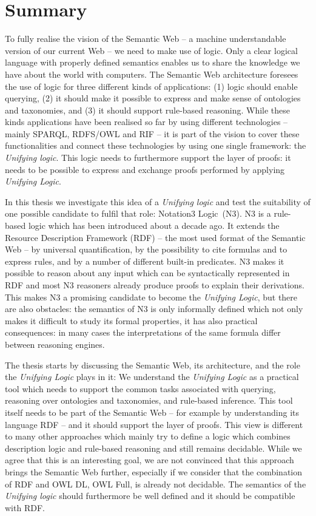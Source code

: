 \chapter{Summary}
\setlength{\epigraphrule}{0pt}
\setlength{\epigraphwidth}{0.48\textwidth}

To fully realise the vision of the Semantic Web -- a machine understandable version of our current Web -- we need to make use of logic. 
Only a clear logical language with properly defined semantics enables us to share the knowledge we have about the world with computers.
The Semantic Web architecture foresees the use of logic for three different kinds of applications: (1) logic should enable querying,
(2) it should make it possible to express and make sense of ontologies and taxonomies, and (3) it should support rule-based reasoning. 
While these kinds applications have been realised so far by using different technologies -- mainly SPARQL, RDFS/OWL and RIF --
it is part of the vision to cover these functionalities and connect these technologies by using one single framework: the \emph{Unifying logic}. 
This logic needs to furthermore support the layer of proofs: it needs to be possible to express and exchange proofs performed by applying \emph{Unifying Logic}.

In this thesis we investigate this idea of a \emph{Unifying logic} and test the suitability of one possible candidate to fulfil that role: Notation3 Logic~(N3).
N3 is a rule-based logic which has been introduced about a decade ago. It extends the Resource Description Framework (RDF) -- the most used format of the Semantic Web -- 
by universal quantification, by the possibility to cite formulas and to express rules, and by a number of different built-in predicates.
N3 makes it possible to reason about any input which can be syntactically represented in RDF and most N3 reasoners already produce proofs to explain their 
derivations. This makes N3 a promising candidate to become the \emph{Unifying Logic}, but there are also obstacles: 
the semantics of N3 is only informally defined which not only 
makes it difficult to study its formal properties,
it has also practical consequences: in many cases the interpretations of the same formula differ between reasoning engines. 

The thesis starts by discussing the Semantic Web, its architecture, and the role the \emph{Unifying Logic} plays in it: 
We understand the \emph{Unifying Logic} 
as a practical tool which needs to support the common tasks associated with querying, reasoning over ontologies and taxonomies, and rule-based inference.
This tool itself needs to be part of the Semantic Web -- for example by understanding its language RDF -- and it should support the layer of proofs.
This view is different to many other approaches which mainly try to define a logic which combines description logic and rule-based reasoning and still remains decidable.
While we agree that this is an interesting goal, we are not convinced that this approach brings the Semantic Web further, especially if we consider that the combination 
of RDF and OWL DL, OWL Full, is already not decidable. The semantics of the \emph{Unifying logic} should furthermore be well defined and it should be compatible with RDF.


